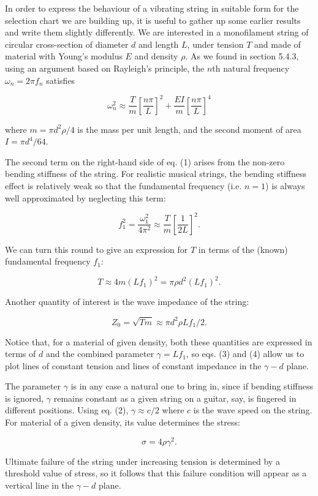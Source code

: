  In order to express the behaviour of a vibrating string in suitable form for 
  the selection chart we are building up, it is useful to gather up some 
  earlier results and write them slightly differently. We are interested in a 
  monofilament string of circular cross-section of diameter $d$ and length $L$, 
  under tension $T$ and made of material with Young's modulus $E$ and density 
  $\rho$. As we found in section 5.4.3, using an argument based on Rayleigh's 
  principle, the $n$th natural frequency $\omega_n=2\pi f_n$ satisfies 

  $$\omega_n^2 \approx \dfrac{T}{m} \left[ \dfrac{n\pi}{L} \right] ^2 + 
  \dfrac{EI}{m} \left[ \dfrac{n\pi}{L} \right] ^4 \tag{1}$$ 

  where $m=\pi d^2 \rho /4$ is the mass per unit length, and the second moment 
  of area $I=\pi d^4 /64$. 

  The second term on the right-hand side of eq. (1) arises from the non-zero 
  bending stiffness of the string. For realistic musical strings, the bending 
  stiffness effect is relatively weak so that the fundamental frequency (i.e. 
  $n = 1$) is always well approximated by neglecting this term: 

  $$f_1^2 = \dfrac{\omega_1^2}{4 \pi^2} \approx \dfrac{T}{m}\left[ 
  \dfrac{1}{2L} \right] ^2 . \tag{2}$$ 

  We can turn this round to give an expression for $T$ in terms of the (known) 
  fundamental frequency $f_1$: 

  $$T \approx 4m(Lf_1)^2 = \pi \rho d^2 (Lf_1)^2 . \tag{3}$$ 

  Another quantity of interest is the wave impedance of the string: 

  $$Z_0 = \sqrt{Tm} \approx \pi d^2 \rho L f_1 /2 . \tag{4}$$ 

  Notice that, for a material of given density, both these quantities are 
  expressed in terms of $d$ and the combined parameter $\gamma=Lf_1$, so eqs. 
  (3) and (4) allow us to plot lines of constant tension and lines of constant 
  impedance in the $\gamma-d$ plane. 

  The parameter $\gamma$ is in any case a natural one to bring in, since if 
  bending stiffness is ignored, $\gamma$ remains constant as a given string on 
  a guitar, say, is fingered in different positions. Using eq. (2), $\gamma 
  \approx c/2$ where $c$ is the wave speed on the string. For material of a 
  given density, its value determines the stress: 

  $$\sigma = 4 \rho \gamma^2. \tag{5}$$ 

  Ultimate failure of the string under increasing tension is determined by a 
  threshold value of stress, so it follows that this failure condition will 
  appear as a vertical line in the $\gamma-d$ plane. 